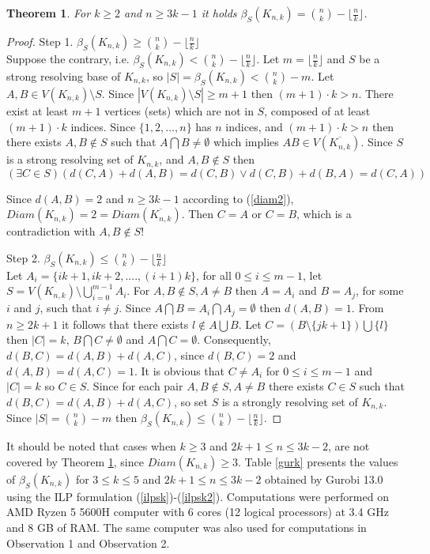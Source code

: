 \documentclass[preprint,12pt]{elsarticle}
\newtheorem{thm}{Theorem}
\begin{document}
\begin{thm} \label{k3s} For $k \ge 2$ and $n \ge 3k-1$ it holds $\beta_S(K_{n,k}) = \binom{n}{k} - \lfloor \frac{n}{k} \rfloor$.
\end{thm}
\begin{proof}
Step 1. $\beta_S(K_{n,k}) \ge \binom{n}{k} - \lfloor \frac{n}{k} \rfloor$ \\
Suppose the contrary, i.e. $\beta_S(K_{n,k}) < \binom{n}{k} - \lfloor \frac{n}{k} \rfloor$.
Let $m = \lfloor \frac{n}{k} \rfloor$ and $S$ be a strong resolving base of $K_{n,k}$, so $|S| = \beta_S(K_{n,k}) < \binom{n}{k} - m$.
Let $A,B \in V(K_{n,k}) \setminus S$. Since $|V(K_{n,k}) \setminus S| \ge m+1$ then $(m+1) \cdot k > n$.
There exist at least $m+1$ vertices (sets) which are not in $S$, composed of at least $(m+1) \cdot k$ indices.
Since $\{1,2,...,n\}$ has $n$ indices, and $(m+1) \cdot k > n$ then there exists $A,B \notin S$ such
that $A \bigcap B \ne \emptyset$  which implies $AB \in V(\overline{K_{n,k}})$. Since $S$ is a
strong resolving set of $K_{n,k}$, and $A,B \notin S$ then 
$$(\exists C \in S) (d(C,A)+d(A,B)=d(C,B) \vee d(C,B)+d(B,A)=d(C,A))$$

Since $d(A,B)=2$ and $n \ge 3k-1$ according to (\ref{diam2}), $Diam(K_{n,k}) = 2 = Diam(\overline{K_{n,k}})$.
Then $C=A$ or $C=B$,
which is a contradiction with $A,B \notin S$!


Step 2. $\beta_S(K_{n,k}) \le \binom{n}{k} - \lfloor \frac{n}{k} \rfloor$ \\
Let $A_i = \{ik+1, ik+2, ...., (i+1)k\}$, for all $0 \le i \le m-1$,
let $S = V(K_{n,k}) \setminus \bigcup\limits_{i = 0}^{m - 1} {{A_i}}$.
For $A,B \notin S, A \ne B$ then $A=A_i$ and $B=A_j$, for some $i$ and $j$, such that $i \ne j$.
Since $A \bigcap B = A_i \bigcap A_j = \emptyset$ then $d(A,B) = 1$.
From $n \ge 2k+1$ it follows that there exists $l \notin A \bigcup B$.
Let $C = (B \setminus \{jk+1\}) \bigcup \{l\}$ then $|C|=k$, $B \bigcap C \ne \emptyset$
and $A \bigcap C = \emptyset$. Consequently, $d(B,C) = d(A,B) + d(A,C)$,
since $d(B,C)=2$ and $d(A,B) = d(A,C) = 1$.
It is obvious that $C \ne A_i$ for $0 \le i \le m-1$ and $|C|=k$ so
$C \in S$. Since for each pair $A,B \notin S, A \ne B$ there exists $C \in S$
such that $d(B,C) = d(A,B) + d(A,C)$, so set $S$ is a strongly resolving 
set of $K_{n,k}$. Since $|S|= \binom{n}{k} - m$ then $\beta_S(K_{n,k}) \le \binom{n}{k} - \lfloor \frac{n}{k} \rfloor$. 
\end{proof}

It should be noted that cases when $k \ge 3$ and $2k+1 \le n \le 3k-2$, are not covered by Theorem \ref{k3s},
since $Diam(K_{n,k}) \ge 3$. Table \ref{gurk} presents the values of $\beta_S(K_{n,k})$ for $3 \le k \le 5$
and $2k+1 \le n \le 3k-2$ obtained by Gurobi 13.0 using the ILP formulation (\ref{ilpsk})-(\ref{ilpsk2}).
Computations were performed on AMD Ryzen 5 5600H computer with 6 cores (12 logical processors) at 3.4 GHz and 8 GB of RAM. 
The same computer was also used for computations in Observation 1 and Observation 2.
\end{document}

